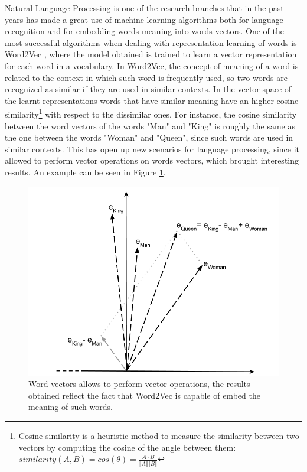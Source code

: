 \documentclass[%
    corpo=13.5pt,
    twoside,
    oldstyle,
    tipotesi=magistrale,
    greek,
    evenboxes
]{toptesi}
\begin{document}
Natural Language Processing is one of the research branches that in
the past years has made a great use of machine learning algorithms both for
language recognition and for embedding words meaning into words
vectors.
One of the most successful algorithms when dealing with representation learning
of words is Word2Vec \cite{mikolov2013}, where the model obtained is trained to
learn a vector representation for each word in a vocabulary.
In Word2Vec, the concept of meaning of a word is related to the context in
which such word is frequently used, so two words are recognized as similar if
they are used in similar contexts. In the vector space of the learnt
representations words that have similar meaning have an higher
cosine similarity\footnote{
    Cosine similarity is a heuristic method to measure the
    similarity between two vectors by computing the cosine of the angle between
    them:
    $similarity(A,B) = cos(\theta) = \frac{A \cdot B}{\Vert A \Vert \Vert B \Vert}$
}
with respect to the dissimilar ones.
For instance, the cosine similarity between the word vectors of the words "Man"
and "King" is roughly the same as the one between the words "Woman" and "Queen",
since such words are used in similar contexts. This has open up new scenarios
for language processing, since it allowed to perform vector
operations on words vectors, which brought interesting results.
An example can be seen in Figure \ref{fig:word2vec}.

\begin{figure}[t]
    \centering
    \includegraphics[scale=0.4]{img/word2vec.png}
    \caption{
        Word vectors allows to perform vector operations, the results
        obtained reflect the fact that Word2Vec is capable of embed the
        meaning of such words.
    }
    \label{fig:word2vec}
    \end{figure}
\end{document}
